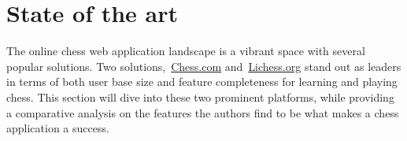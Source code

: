 \section{State of the art}\label{sec:state-of-the-art}

The online chess web application landscape is a vibrant space with several popular
solutions.
Two solutions,~\url{Chess.com} and~\url{Lichess.org} stand out as leaders in terms
of both user base size and feature completeness for learning and playing chess.
This section will dive into these two prominent platforms, while providing a
comparative analysis on the features the authors find to be what makes a
chess application a success.




